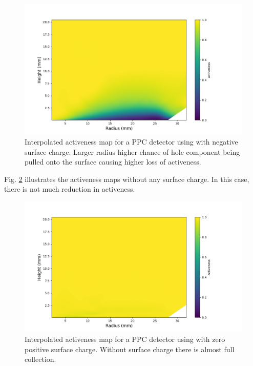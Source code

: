 \begin{figure}%
\includegraphics[trim={1.4cm 0.5cm 3.2cm 1.755cm},clip,width=0.9\linewidth]{ch5/figs/activeness_map_cubic_sc=-0.3_ponama_1_5000.png}
\caption{Interpolated activeness map for a PPC detector using \ehd with negative surface charge. Larger radius higher chance of hole component being pulled onto the surface causing higher loss of activeness.}
\label{ch5_fig_activeness_map_neg}
\end{figure}

Fig. \ref{ch5_fig_interpolated_activeness_map_0} illustrates the activeness maps without any surface charge. In this case, there is not much reduction in activeness. 

\begin{figure}%
\includegraphics[trim={1.5cm 0cm 3.3cm 1cm},clip,width=0.9\linewidth]{ch5/figs/activeness_map_cubic_sc=0_ponama_1_5000.png}
\caption{Interpolated activeness map for a PPC detector using \ehd with zero positive surface charge. Without surface charge there is almost full collection.}
\label{ch5_fig_interpolated_activeness_map_0}
\end{figure}

